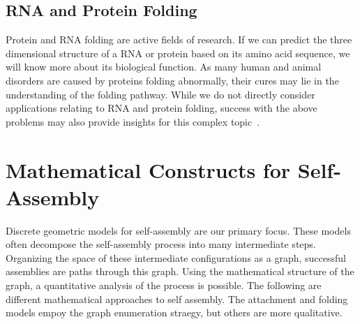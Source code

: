 \subsection{RNA and Protein Folding}

Protein and RNA folding are active fields of research. If we can predict the three dimensional structure of a RNA or protein based on its amino acid sequence, we will know more about its biological function. As many human and animal disorders are caused by proteins folding abnormally, their cures may lie in the understanding of the folding pathway. While we do not directly consider applications relating to RNA and protein folding, success with the above problems may also provide insights for this complex topic~\cite{Lindorff-Larsen2011}.


\section{Mathematical Constructs for Self-Assembly}

Discrete geometric models for self-assembly are our primary focus. These models often decompose the self-assembly process into many intermediate steps. Organizing the space of these intermediate configurations as a graph, successful assemblies are paths through this graph. Using the mathematical structure of the graph, a quantitative analysis of the process is possible. The following are different mathematical approaches to self assembly. The attachment and folding models empoy the graph enumeration straegy, but others are more qualitative. 







